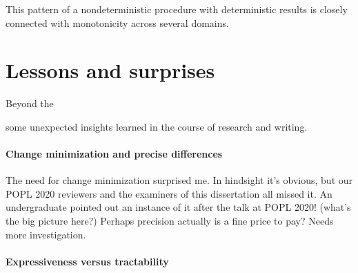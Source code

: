 

This pattern of a nondeterministic procedure with deterministic results is closely connected with monotonicity across several domains. \XXX



\section{Lessons and surprises}

Beyond the 

some unexpected insights learned in the course of research and writing.

\XXX

\paragraph{Change minimization and precise differences}

The need for change minimization surprised me. In hindsight it's obvious, but our POPL 2020 reviewers and the examiners of this dissertation all missed it. An undergraduate pointed out an instance of it after the talk at POPL 2020! (what's the big picture here?) Perhaps precision actually is a fine price to pay? Needs more investigation.

\paragraph{Expressiveness versus tractability}

